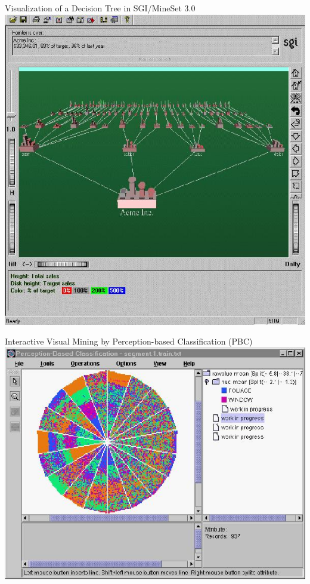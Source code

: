 \begin{frame}{Visualization of a Decision Tree in SGI/MineSet 3.0}
	\centering
	\includegraphics[height=0.8\textheight]{img/classification2.jpeg}
\end{frame}

\begin{frame}{Interactive Visual Mining by Perception-based Classification (PBC)}
	\centering
	\includegraphics[height=0.8\textheight]{img/classification3.jpeg}
\end{frame}
